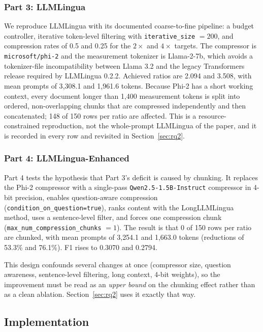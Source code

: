 \documentclass[10pt,a4paper,twocolumn]{article}
\begin{document}
\subsubsection{Part 3: LLMLingua}

We reproduce LLMLingua with its documented coarse-to-fine pipeline: a budget
controller, iterative token-level filtering with \texttt{iterative\_size} $=200$,
and compression rates of 0.5 and 0.25 for the $2\times$ and $4\times$ targets.
The compressor is \texttt{microsoft/phi-2} and the measurement tokenizer is
Llama-2-7b, which avoids a tokenizer-file incompatibility between Llama 3.2 and
the legacy Transformers release required by LLMLingua 0.2.2. Achieved ratios are
2.094 and 3.508, with mean prompts of 3{,}308.1 and 1{,}961.6 tokens. Because
Phi-2 has a short working context, every document longer than 1{,}400 measurement
tokens is split into ordered, non-overlapping chunks that are compressed
independently and then concatenated; 148 of 150 rows per ratio are affected. This
is a resource-constrained reproduction, not the whole-prompt LLMLingua of the
paper, and it is recorded in every row and revisited in Section~\ref{sec:rq2}.

\subsubsection{Part 4: LLMLingua-Enhanced}

Part 4 tests the hypothesis that Part 3's deficit is caused by chunking. It
replaces the Phi-2 compressor with a single-pass \texttt{Qwen2.5-1.5B-Instruct}
compressor in 4-bit precision, enables question-aware compression
(\texttt{condition\_on\_question=true}), ranks content with the LongLLMLingua
method, uses a sentence-level filter, and forces one compression chunk
(\texttt{max\_num\_compression\_chunks} $=1$). The result is that 0 of 150 rows
per ratio are chunked, with mean prompts of 3{,}254.1 and 1{,}663.0 tokens
(reductions of 53.3\% and 76.1\%). F1 rises to 0.3070 and 0.2794.

This design confounds several changes at once (compressor size, question
awareness, sentence-level filtering, long context, 4-bit weights), so the
improvement must be read as an \emph{upper bound} on the chunking effect rather
than as a clean ablation. Section~\ref{sec:rq2} uses it exactly that way.

\subsection{Implementation}
\end{document}
